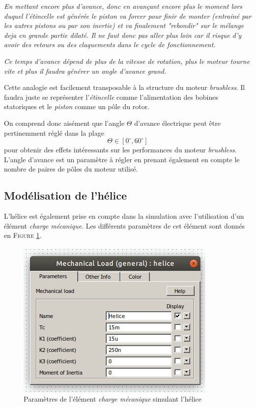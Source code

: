 			\textit{En mettant encore plus d'avance, donc en avançant encore plus le moment
			lors duquel l'étincelle est générée le piston va forcer pour finir de 
			monter (entrainé par les autres pistons ou par son inertie) et va 
			finalement "rebondir" sur le mélange deja en grande partie dilaté.
			Il ne faut donc pas aller plus loin car il risque d'y avoir des retours
			ou des claquements dans le cycle de fonctionnement. }

			\textit{Ce temps d'avance dépend de plus de la vitesse de rotation, plus le moteur
			tourne vite et plus il faudra générer un angle d'avance grand.}
			
			Cette analogie est facilement transposable à la structure
			du moteur \textit{brushless}. Il faudra juste se représenter
			l'\textit{étincelle} comme l'alimentation des bobines statoriques
			et le \textit{piston} comme un pôle du rotor.
			
			On comprend donc aisément que l'angle $\Theta$ d'avance
			électrique peut être pertinemment réglé dans la plage
			\begin{equation}
			\Theta\in [0^{\circ},60^{\circ}]
			\end{equation}
			pour obtenir des effets intéressants sur les performances 
			du moteur \textit{brushless}. L'angle d'avance est un 
			paramètre à régler en prenant également en compte le nombre
			de paires de pôles du moteur utilisé.
			
		\vspace{-1em}
			
		\subsection{Modélisation de l'hélice}
				
		L'hélice est également prise en compte dans la simulation avec
		l'utilisation d'un élément \textit{charge mécanique}.
		Les différents paramètres de cet élément sont donnés
		en \textsc{Figure \ref{helice}}.
		
		\begin{figure}[h]
			\begin{center}
				\includegraphics[scale=0.5]{../Illus/helice.png}
			\end{center}
			\vspace{-1em}
			\caption{Paramètres de l'élément \textit{charge mécanique} simulant l'hélice}
			\label{helice}
		\end{figure}
				
